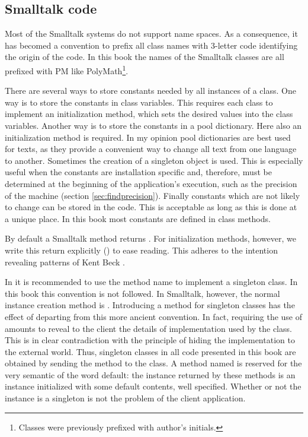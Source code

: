 \subsection{Smalltalk code}
Most of the Smalltalk systems do not support name spaces. As a
consequence, it has becomed a convention to prefix all class names
with 3-letter code identifying the origin of the code. In this
book the names of the Smalltalk classes are all prefixed with PM like PolyMath\footnote{Classes were previously prefixed with author's initials.}.

There are several ways to store constants needed by all instances
of a class. One way is to store the constants in class variables.
This requires each class to implement an initialization method,
which sets the desired values into the class variables. Another
way is to store the constants in a pool dictionary. Here also an
initialization method is required. In my opinion pool dictionaries
are best used for texts, as they provide a convenient way to
change all text from one language to another. Sometimes the
creation of a singleton object is used. This is especially useful
when the constants are installation specific and, therefore, must
be determined at the beginning of the application's execution,
such as the precision of the machine (\cf section
\ref{sec:findprecision}). Finally constants which are not likely
to change can be stored in the code. This is acceptable as long as
this is done at a unique place. In this book most constants are
defined in class methods.

By default a Smalltalk method returns . For
initialization methods, however, we write this return explicitly
() to ease reading. This adheres to the intention
revealing patterns of Kent Beck \cite{Beck}.

In \cite{StDesPat} it is recommended to use the method name  to implement a singleton class. In this book this
convention is not followed. In Smalltalk, however, the normal
instance creation method is . Introducing a method  for singleton classes has the effect of departing from
this more ancient convention. In fact, requiring the use of  amounts to reveal to the client the details of
implementation used by the class. This is in clear contradiction
with the principle of hiding the implementation to the external
world.
Thus, singleton classes in all code presented in this book
are obtained by sending the method  to the class.
A method named  is reserved for the very semantic of
the word default: the instance returned by these methods is an
instance initialized with some default contents, well specified.
Whether or not the instance is a singleton is not the problem of
the client application.

